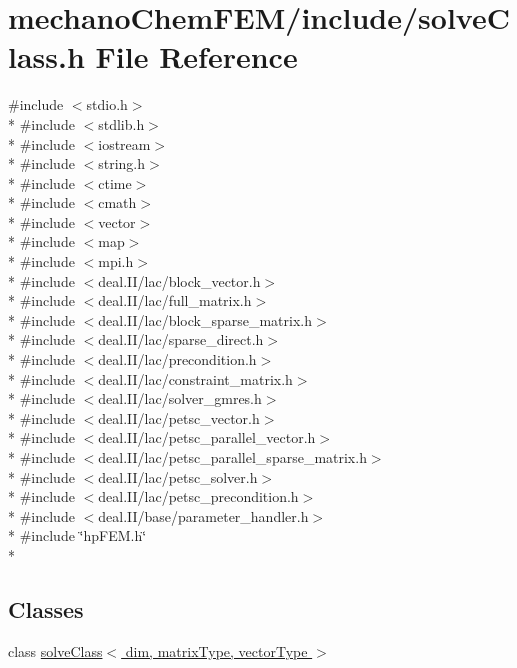 \section{mechano\-Chem\-F\-E\-M/include/solve\-Class.h File Reference}
\label{solve_class_8h}
{\ttfamily \#include $<$stdio.\-h$>$}\\*
{\ttfamily \#include $<$stdlib.\-h$>$}\\*
{\ttfamily \#include $<$iostream$>$}\\*
{\ttfamily \#include $<$string.\-h$>$}\\*
{\ttfamily \#include $<$ctime$>$}\\*
{\ttfamily \#include $<$cmath$>$}\\*
{\ttfamily \#include $<$vector$>$}\\*
{\ttfamily \#include $<$map$>$}\\*
{\ttfamily \#include $<$mpi.\-h$>$}\\*
{\ttfamily \#include $<$deal.\-I\-I/lac/block\-\_\-vector.\-h$>$}\\*
{\ttfamily \#include $<$deal.\-I\-I/lac/full\-\_\-matrix.\-h$>$}\\*
{\ttfamily \#include $<$deal.\-I\-I/lac/block\-\_\-sparse\-\_\-matrix.\-h$>$}\\*
{\ttfamily \#include $<$deal.\-I\-I/lac/sparse\-\_\-direct.\-h$>$}\\*
{\ttfamily \#include $<$deal.\-I\-I/lac/precondition.\-h$>$}\\*
{\ttfamily \#include $<$deal.\-I\-I/lac/constraint\-\_\-matrix.\-h$>$}\\*
{\ttfamily \#include $<$deal.\-I\-I/lac/solver\-\_\-gmres.\-h$>$}\\*
{\ttfamily \#include $<$deal.\-I\-I/lac/petsc\-\_\-vector.\-h$>$}\\*
{\ttfamily \#include $<$deal.\-I\-I/lac/petsc\-\_\-parallel\-\_\-vector.\-h$>$}\\*
{\ttfamily \#include $<$deal.\-I\-I/lac/petsc\-\_\-parallel\-\_\-sparse\-\_\-matrix.\-h$>$}\\*
{\ttfamily \#include $<$deal.\-I\-I/lac/petsc\-\_\-solver.\-h$>$}\\*
{\ttfamily \#include $<$deal.\-I\-I/lac/petsc\-\_\-precondition.\-h$>$}\\*
{\ttfamily \#include $<$deal.\-I\-I/base/parameter\-\_\-handler.\-h$>$}\\*
{\ttfamily \#include \char`\"{}hp\-F\-E\-M.\-h\char`\"{}}\\*
\subsection*{Classes}
\begin{DoxyCompactItemize}
\item 
class \hyperlink{classsolve_class}{solve\-Class$<$ dim, matrix\-Type, vector\-Type $>$}
\end{DoxyCompactItemize}
